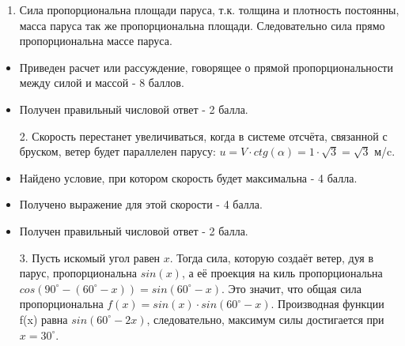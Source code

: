 \solutionSection

\begin{enumerate}
    \item Сила пропорциональна площади паруса, т.к. толщина и плотность постоянны, 
	масса паруса так же пропорциональна площади. Следовательно сила прямо пропорциональна массе паруса.

\end{enumerate}

\additionalCriteria

\begin{itemize}
    \item Приведен расчет или рассуждение, говорящее о прямой пропорциональности между силой и массой - 8 баллов.
    \item Получен правильный числовой ответ - 2 балла.
    
\end{itemize}

\begin{enumerate}
    \item[2.] Скорость перестанет увеличиваться, когда в системе отсчёта, связанной с бруском, 
    ветер будет параллелен парусу: $u=V\cdot ctg(\alpha)=1\cdot \sqrt{3}= \sqrt{3}$ м/c.
    
\end{enumerate}

\additionalCriteria

\begin{itemize}
    \item Найдено условие, при котором скорость будет максимальна - 4 балла.
    \item Получено выражение для этой скорости - 4 балла.
    \item Получен правильный числовой ответ - 2 балла.
\end{itemize}

\begin{enumerate}
    \item[3.] Пусть искомый угол равен $x$. Тогда сила, которую создаёт ветер, дуя в парус, 
    пропорциональна $sin(x)$, а её проекция на киль пропорциональна \linebreak $cos(90^\circ - (60^\circ - x)) = sin(60^\circ - x)$. 
    Это значит, что общая сила пропорциональна $f(x) = sin(x) \cdot sin(60^\circ - x)$. Производная функции f(x) 
    равна $sin(60^\circ - 2x)$, следовательно, максимум силы достигается при $x = 30^\circ$.
    
\end{enumerate}

